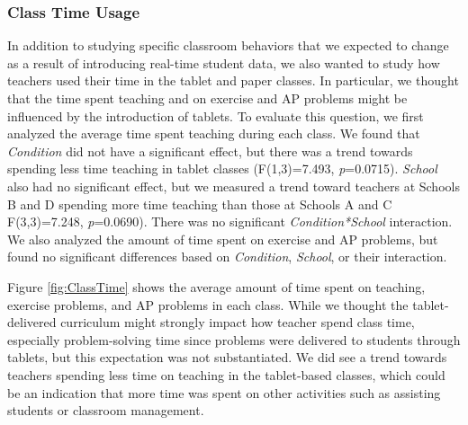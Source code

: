 \documentclass{sigchi}
\begin{document}
\subsubsection{Class Time Usage}
In addition to studying specific classroom behaviors that we expected to change as a result of introducing real-time student data, we also wanted to study how teachers used their time in the tablet and paper classes. In particular, we thought that the time spent teaching and on exercise and AP problems might be influenced by the introduction of tablets. To evaluate this question, we first analyzed the average time spent teaching during each class. We found that \emph{Condition} did not have a significant effect, but there was a trend towards spending less time teaching in tablet classes (F(1,3)=7.493, \emph{p}=0.0715). \emph{School} also had no significant effect, but we measured a trend toward teachers at Schools B and D spending more time teaching than those at Schools A and C F(3,3)=7.248, \emph{p}=0.0690). There was no significant \emph{Condition*School} interaction. We also analyzed the amount of time spent on exercise and AP problems, but found no significant differences based on \emph{Condition}, \emph{School}, or their interaction. 

Figure \ref{fig:ClassTime} shows the average amount of time spent on teaching, exercise problems, and AP problems in each class. While we thought the tablet-delivered curriculum might strongly impact how teacher spend class time, especially problem-solving time since problems were delivered to students through tablets, but this expectation was not substantiated. We did see a trend towards teachers spending less time on teaching in the tablet-based classes, which could be an indication that more time was spent on other activities such as assisting students or classroom management. 

%
%
\end{document}
